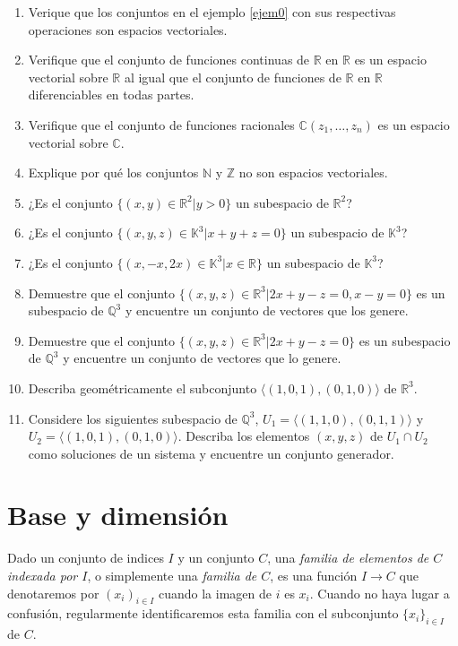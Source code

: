 \begin{enumerate}
  \item Verique que los conjuntos en el ejemplo \ref{ejem0} con sus respectivas operaciones son espacios vectoriales.
  \item Verifique que el conjunto de funciones continuas de $\mathbb{R}$ en $\mathbb{R}$ es un espacio vectorial sobre $\mathbb{R}$ al igual que el conjunto de funciones de $\mathbb{R}$ en $\mathbb{R}$ diferenciables en todas partes.
  \item Verifique que el conjunto de funciones racionales $\mathbb{C}(z_1,\ldots,z_n)$ es un espacio vectorial sobre $\mathbb{C}$.
  \item Explique por qué los conjuntos $\mathbb{N}$ y $\mathbb{Z}$ no son espacios vectoriales.
  \item ¿Es el conjunto $\{(x,y)\in\mathbb{R}^2|y>0\}$ un subespacio de $\mathbb{R}^2$?
  \item ¿Es el conjunto $\{(x,y,z)\in\mathbb{K}^3|x+y+z=0\}$ un subespacio de $\mathbb{K}^3$?
  \item ¿Es el conjunto $\{(x,-x,2x)\in\mathbb{K}^3|x\in\mathbb{R}\}$ un subespacio de $\mathbb{K}^3$?
  \item Demuestre que el conjunto $\{(x,y,z)\in\mathbb{R}^3|2x+y-z=0,x-y=0\}$ es un subespacio de $\mathbb{Q}^3$ y encuentre un conjunto de vectores que los genere.
  \item Demuestre que el conjunto $\{(x,y,z)\in\mathbb{R}^3|2x+y-z=0\}$ es un subespacio de $\mathbb{Q}^3$ y encuentre un conjunto de vectores que lo genere.
  \item Describa geométricamente el subconjunto $\langle (1,0,1), (0,1,0)\rangle$ de $\mathbb{R}^3$.
  \item Considere los siguientes subespacio de $\mathbb{Q}^3$, $U_1=\langle (1,1,0), (0,1,1)\rangle$ y $U_2=\langle (1,0,1), (0,1,0)\rangle$. Describa los elementos $(x,y,z)$ de $U_1\cap U_2$ como soluciones de un sistema y encuentre un conjunto generador.
\end{enumerate}

\section{Base y dimensi\'on}

Dado un conjunto de indices $I$ y un conjunto $C$, una \emph{familia de elementos de $C$ indexada por $I$}, o simplemente una \emph{familia de $C$}, es una función $I\rightarrow C$ que denotaremos por $(x_i)_{i\in I}$ cuando la imagen de $i$ es $x_i$. Cuando no haya lugar a confusión, regularmente identificaremos esta familia con el subconjunto $\{x_i\}_{i\in I}$ de $C$.

